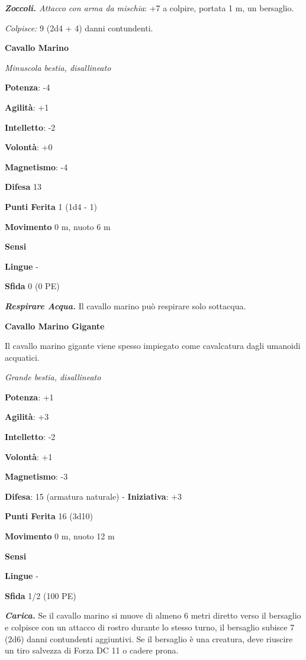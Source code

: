 \begin{multicols}{2}
\emph{\textbf{Zoccoli.} Attacco con arma da mischia}: +7 a colpire,
portata 1 m, un bersaglio.

\emph{Colpisce:} 9 (2d4 + 4) danni contundenti.

\textbf{Cavallo Marino}

\emph{Minuscola bestia, disallineato}

\textbf{Potenza}: -4

\textbf{Agilità}: +1

\textbf{Intelletto}: -2

\textbf{Volontà}: +0

\textbf{Magnetismo}: -4

\textbf{Difesa} 13

\textbf{Punti Ferita} 1 (1d4 - 1)

\textbf{Movimento} 0 m, nuoto 6 m

\textbf{Sensi} 

\textbf{Lingue} -

\textbf{Sfida} 0 (0 PE)\smallskip

\emph{\textbf{Respirare Acqua.}} Il cavallo marino può respirare solo
sottacqua.

\textbf{Cavallo Marino Gigante}

Il cavallo marino gigante viene spesso impiegato come cavalcatura dagli
umanoidi acquatici.

\emph{Grande bestia, disallineato}

\textbf{Potenza}: +1

\textbf{Agilità}: +3

\textbf{Intelletto}: -2

\textbf{Volontà}: +1

\textbf{Magnetismo}: -3

\textbf{Difesa}: 15 (armatura naturale) - \textbf{Iniziativa}: +3

\textbf{Punti Ferita} 16 (3d10)

\textbf{Movimento} 0 m, nuoto 12 m

\textbf{Sensi} 

\textbf{Lingue} -

\textbf{Sfida} 1/2 (100 PE)\smallskip

\emph{\textbf{Carica.}} Se il cavallo marino si muove di almeno 6 metri
diretto verso il bersaglio e colpisce con un attacco di rostro durante
lo stesso turno, il bersaglio subisce 7 (2d6) danni contundenti
aggiuntivi. Se il bersaglio è una creatura, deve riuscire un tiro
salvezza di Forza DC 11 o cadere prona.


\end{multicols}

